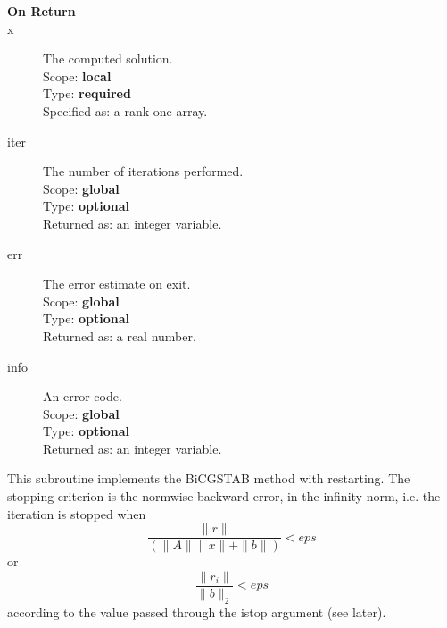 \begin{description}
\item[\bf On Return] 
\item[x] The computed solution. \\
Scope: {\bf local} \\
Type: {\bf required}\\
Specified as: a rank one array.
\item[iter]  The number of iterations performed.\\
Scope: {\bf global} \\
Type: {\bf optional}\\
Returned  as: an integer variable.
\item[err]  The error estimate on exit.\\
Scope: {\bf global} \\
Type: {\bf optional}\\
Returned  as: a real number.
\item[info]  An error code.\\
Scope: {\bf global} \\
Type: {\bf optional}\\
Returned  as: an integer variable.
\end{description}


%
%

This subroutine implements the BiCGSTAB method with restarting. The
stopping criterion is the normwise backward error, in the infinity
norm, i.e. the iteration is stopped when 
\[ \frac{\|r\|}{(\|A\|\|x\|+\|b\|)} < eps \]
or
\[ \frac{\|r_i\|}{\|b\|_2} < eps \]
according to the value passed through the  istop argument (see later).



